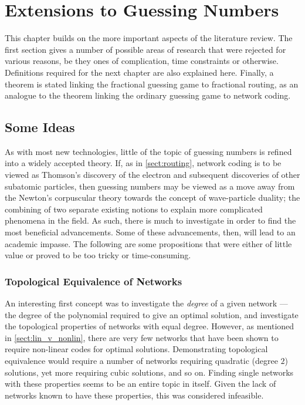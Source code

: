 
\chapter{Extensions to Guessing Numbers}
\label{ch:prob}

This chapter builds on the more important aspects of the literature review. The first section gives a number of possible areas of research that were rejected for various reasons, be they ones of complication, time constraints or otherwise. Definitions required for the next chapter are also explained here. Finally, a theorem is stated linking the fractional guessing game to fractional routing, as an analogue to the theorem linking the ordinary guessing game to network coding.

\section{Some Ideas}
\label{sect:ideas}

As with most new technologies, little of the topic of guessing numbers is refined into a widely accepted theory. If, as in \autoref{sect:routing}, network coding is to be viewed as Thomson's discovery of the electron and subsequent discoveries of other subatomic particles, then guessing numbers may be viewed as a move away from the Newton's corpuscular theory towards the concept of wave-particle duality; the combining of two separate existing notions to explain more complicated phenomena in the field. As such, there is much to investigate in order to find the most beneficial advancements. Some of these advancements, then, will lead to an academic impasse. The following are some propositions that were either of little value or proved to be too tricky or time-consuming.

\subsection{Topological Equivalence of Networks}

An interesting first concept was to investigate the \emph{degree} of a given network --- the degree of the polynomial required to give an optimal solution, and investigate the topological properties of networks with equal degree. However, as mentioned in \autoref{sect:lin_v_nonlin}, there are very few networks that have been shown to require non-linear codes for optimal solutions. Demonstrating topological equivalence would require a number of networks requiring quadratic (degree $2$) solutions, yet more requiring cubic solutions, and so on. Finding single networks with these properties seems to be an entire topic in itself. Given the lack of networks known to have these properties, this was considered infeasible.

